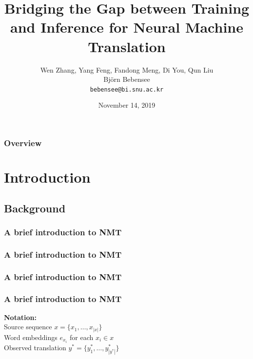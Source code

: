 \documentclass{beamer}
\title{Bridging the Gap between Training and Inference for Neural Machine Translation}
\author[Bj\"orn Bebensee]{
    Wen Zhang, Yang Feng, Fandong Meng, Di You, Qun Liu\\
    \bigskip
    Bj\"orn Bebensee\\
    \medskip
    {\tt bebensee@bi.snu.ac.kr} 
}
\institute[Biointelligence Laboratory]{
    \normalsize Biointelligence Laboratory
}
\date{November 14, 2019}
\begin{document}
\begin{frame}
    \titlepage
\end{frame}

\begin{frame}
    \frametitle{Overview}
    \tableofcontents
\end{frame}



\section{Introduction}

\subsection{Background}


\begin{frame}
    \frametitle{A brief introduction to NMT}

\end{frame}


\begin{frame}
    \frametitle{A brief introduction to NMT}

\end{frame}


\begin{frame}
    \frametitle{A brief introduction to NMT}

\end{frame}


\begin{frame}
    \frametitle{A brief introduction to NMT}
    \textbf{Notation:}\\
    \bigskip
    Source sequence $x = \{ x_1, \ldots, x_{|x|} \}$\\
    \medskip
    Word embeddings $e_{x_i}$ for each $x_i \in x$\\
    \medskip
    Observed translation $y^* = \{ y_1^*, \ldots, y^*_{|y^*|} \}$
\end{frame}
\end{document}
